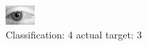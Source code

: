 \begin{figure}[h!]
\begin{center}
\includegraphics[width=0.60\columnwidth]{figures/ID2784_class_4_target_3.png}
\end{center}
\caption{ Classification: 4 actual target: 3}
\label{fig:ID2784_class_4_target_3}
\end{figure}
